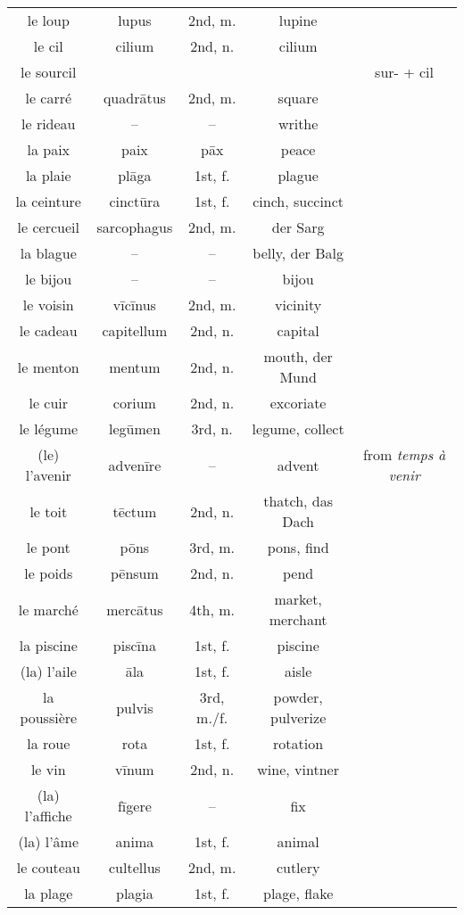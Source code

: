 \documentclass{article}
\begin{document}
\begin{longtable}{ccccc}
    le loup & lupus & 2nd, m. & lupine \\
    le cil & cilium & 2nd, n. & cilium \\
    le sourcil & & & & sur- + cil  \\
    le carr\'e & quadr\=atus & 2nd, m. & square \\
    le rideau & -- & -- & writhe \\
    la paix & paix & p\=ax & peace \\
    la plaie & pl\=aga & 1st, f. & plague \\
    la ceinture & cinct\=ura & 1st, f. & cinch, succinct \\
    le cercueil & sarcophagus & 2nd, m. & der Sarg \\
    la blague & -- & -- & belly, der Balg \\
    le bijou & -- & -- & bijou \\
    le voisin & v\=ic\=inus & 2nd, m. & vicinity \\
    le cadeau & capitellum & 2nd, n. & capital \\
    le menton & mentum & 2nd, n. & mouth, der Mund \\
    le cuir & corium & 2nd, n. & excoriate \\
    le l\'egume & leg\=umen & 3rd, n. & legume, collect \\
    (le) l'avenir & adven\=ire & -- & advent & from \textit{temps à venir}  \\
    le toit & t\=ectum & 2nd, n. & thatch, das Dach \\
    le pont & p\=ons & 3rd, m. & pons, find \\
    le poids & p\=ensum & 2nd, n. & pend \\
    le march\'e & merc\=atus & 4th, m. & market, merchant \\
    la piscine & pisc\=ina & 1st, f. & piscine \\
    (la) l'aile & \=ala & 1st, f. & aisle \\
    la poussi\`ere & pulvis & 3rd, m./f. & powder, pulverize \\
    la roue & rota & 1st, f. & rotation \\
    le vin & v\=inum & 2nd, n. & wine, vintner \\
    (la) l'affiche & f\=igere & -- & fix \\
    (la) l'\^ame & anima & 1st, f. & animal \\
    le couteau & cultellus & 2nd, m. & cutlery \\
    la plage & plagia & 1st, f. & plage, flake \\

\end{longtable}
\end{document}
